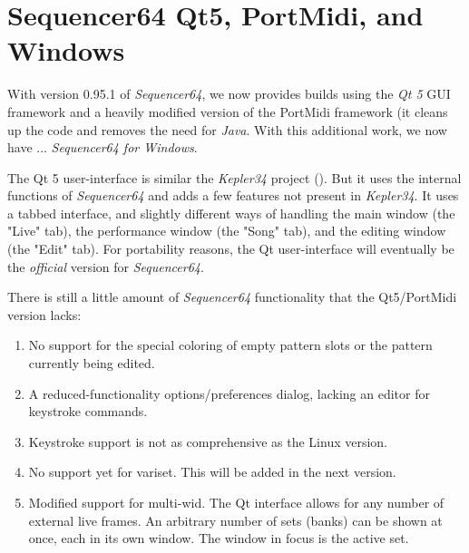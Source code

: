 %
%
%

\section{Sequencer64 Qt5, PortMidi, and Windows}
\label{sec:qt_portmidi}

   With version 0.95.1 of \textsl{Sequencer64}, we now provides builds using
   the \textsl{Qt 5} GUI framework and a heavily modified version of the
   PortMidi framework (it cleans up the code and removes the need for
   \textsl{Java}.
   With this additional work, we now have ...
   \textsl{Sequencer64 for Windows}.

   The Qt 5 user-interface is similar
   the \textsl{Kepler34} project (\cite{kepler34}).
   But it uses the internal functions of \textsl{Sequencer64} and adds a few
   features not present in \textsl{Kepler34}.
   It uses a tabbed interface, and slightly different ways of handling the main
   window (the "Live" tab), the performance window (the "Song" tab), and the
   editing window (the "Edit" tab).
   For portability reasons, the Qt user-interface will eventually be the
   \textsl{official} version for \textsl{Sequencer64}.

   There is still a little amount of \textsl{Sequencer64} functionality that
   the Qt5/PortMidi version lacks:

   \begin{enumerate}
      \item No support for the special coloring of empty pattern slots
         or the pattern currently being edited.
      \item A reduced-functionality options/preferences dialog, lacking an
         editor for keystroke commands.
      \item Keystroke support is not as comprehensive as the Linux version.
      \item No support yet for variset.  This will be added in the next
         version.
      \item Modified support for multi-wid.  The Qt interface allows
         for any number of external live frames.
         An arbitrary number of sets (banks) can be shown at once,
         each in its own window.  The window in focus is the active set.
   \end{enumerate}

